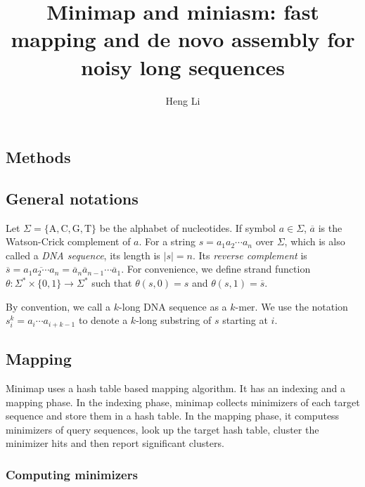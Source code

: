 \documentclass{bioinfo}
\begin{document}

\title[Long-read mapping and assembly]{Minimap and miniasm: fast mapping and de novo assembly for noisy long sequences}
\author[Li]{Heng Li}
\address{Broad Institute, 75 Ames Street, Cambridge, MA 02142, USA}
\maketitle

\begin{methods}

\section{Methods}

\subsection{General notations}

Let $\Sigma=\{\mathrm{A},\mathrm{C},\mathrm{G},\mathrm{T}\}$ be the
alphabet of nucleotides. If symbol $a\in\Sigma$, $\overline{a}$ is the
Watson-Crick complement of $a$. For a string $s=a_1a_2\cdots a_n$ over
$\Sigma$, which is also called a \emph{DNA sequence}, its length is $|s|=n$.
Its \emph{reverse complement} is $\overline{s}=\overline{a_1a_2\cdots
a_n}=\overline{a}_n\overline{a}_{n-1}\cdots\overline{a}_1$.
For convenience, we define strand function
$\theta:\Sigma^*\times\{0,1\}\to\Sigma^*$ such that $\theta(s,0)=s$ and
$\theta(s,1)=\overline{s}$.

By convention, we call a $k$-long DNA sequence as a $k$-mer. We use the
notation $s^k_i=a_i\cdots a_{i+k-1}$ to denote a $k$-long substring of $s$
starting at $i$.

\subsection{Mapping}

Minimap uses a hash table based mapping algorithm. It has an indexing and
a mapping phase. In the indexing phase, minimap collects minimizers of each
target sequence and store them in a hash table. In the mapping phase, it
computess minimizers of query sequences, look up the target hash table, cluster
the minimizer hits and then report significant clusters.

\subsubsection{Computing minimizers}


\end{methods}
\end{document}
